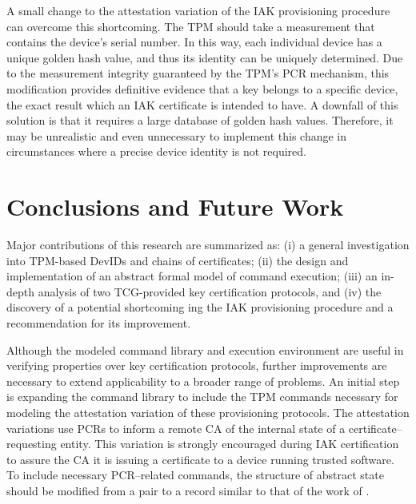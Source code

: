 \documentclass[runningheads]{llncs}
\begin{document}
A small change to the attestation variation of the IAK provisioning
procedure can overcome this shortcoming. The TPM should take a
measurement that contains the device's serial number. In this way,
each individual device has a unique golden hash value, and thus its
identity can be uniquely determined.  Due to the measurement integrity
guaranteed by the TPM's PCR mechanism, this modification provides
definitive evidence that a key belongs to a specific device, the exact
result which an IAK certificate is intended to have. A downfall of
this solution is that it requires a large database of golden hash
values. Therefore, it may be unrealistic and even unnecessary to
implement this change in circumstances where a precise device identity
is not required.%
%
%
%
\section{Conclusions and Future Work}

Major contributions of this research are summarized as: (i) a
general investigation into TPM-based DevIDs and chains of
certificates; (ii) the design and implementation of an abstract formal
model of command execution; (iii) an in-depth analysis of two
TCG-provided key certification protocols, and (iv) the discovery of a
potential shortcoming ing the IAK provisioning procedure and a
recommendation for its improvement.

Although the modeled command library and execution environment are
useful in verifying properties over key certification protocols,
further improvements are necessary to extend applicability to a
broader range of problems. An initial step is expanding the command
library to include the TPM commands necessary for modeling the
attestation variation of these provisioning protocols. The
attestation variations use PCRs to inform a remote CA of the internal
state of a certificate--requesting entity. This variation is strongly
encouraged during IAK certification to assure the CA it is issuing a
certificate to a device running trusted software.  To include
necessary PCR--related commands, the structure of abstract state
should be modified from a pair to a record similar to that of the work
of \citet{PrivacyCAAnalysis-Hall}.
\end{document}
